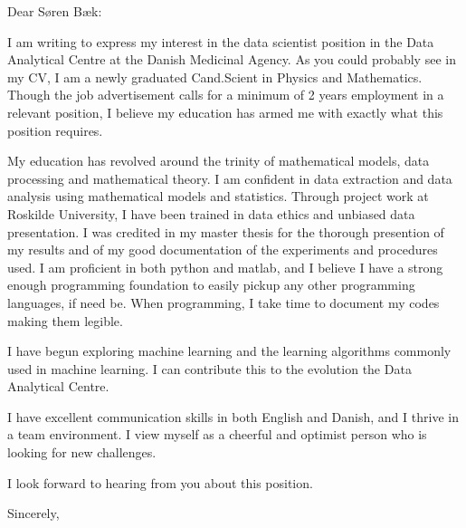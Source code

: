 \documentclass[10pt,a4paper]{letter}
\begin{document}
\begin{letter}{}
\opening{Dear Søren Bæk:}

I am writing to express my interest in the data scientist position in the Data Analytical Centre at the Danish Medicinal Agency. As you could probably see in my CV, I am a newly graduated Cand.Scient in Physics and Mathematics. Though the job advertisement calls for a minimum of 2 years employment in a relevant position, I believe my education has armed me with exactly what this position requires.

My education has revolved around the trinity of mathematical models, data processing and mathematical theory. I am confident in data extraction and data analysis using mathematical models and statistics. Through project work at Roskilde University, I have been trained in data ethics and unbiased data presentation. I was credited in my master thesis for the thorough presention of my results and of my good documentation of the experiments and procedures used. I am proficient in both python and matlab, and I believe I have a strong enough programming foundation to easily pickup any other programming languages, if need be. When programming, I take time to document my codes making them legible.

I have begun exploring machine learning and the learning algorithms commonly used in machine learning. I can contribute this to the evolution the Data Analytical Centre.  

I have excellent communication skills in both English and Danish, and I thrive in a team environment. I view myself as a cheerful and optimist person who is looking for new challenges.     

I look forward to hearing from you about this position.  

\closing{Sincerely,}

\end{letter}

 
\end{document}
